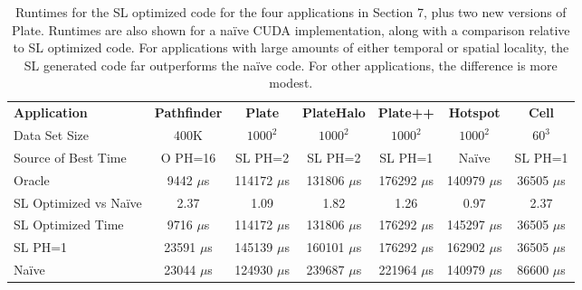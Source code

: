 \documentclass[preprint,nocopyrightspace]{styles/sigplanconf}
\begin{document}
\begin{table}
\centering
\begin{tabular}{|l|c|c|c|c|c|c|}
\hline
{\bf Application} & {\bf Pathfinder} & {\bf Plate} & {\bf PlateHalo} & {\bf Plate++} & {\bf Hotspot} & {\bf Cell} \\
Data Set Size	& 400K	& $1000^2$	& $1000^2$	& $1000^2$	& $1000^2$	& $60^3$	\\
\hline
Source of Best Time & O PH=16 	& SL PH=2	& SL PH=2	& SL PH=1	& Na\"{i}ve	& SL PH=1	\\
Oracle		& 9442 $\mu$s	& 114172 $\mu$s	& 131806 $\mu$s	& 176292 $\mu$s	& 140979 $\mu$s	& 36505 $\mu$s	\\
SL Optimized vs Na\"{i}ve & 2.37 & 1.09		& 1.82		& 1.26		& 0.97		& 2.37		\\
SL Optimized Time & 9716 $\mu$s	& 114172 $\mu$s	& 131806 $\mu$s	& 176292 $\mu$s	& 145297 $\mu$s	& 36505	$\mu$s	\\
SL PH=1		& 23591	$\mu$s	& 145139 $\mu$s	& 160101 $\mu$s	& 176292 $\mu$s	& 162902 $\mu$s	& 36505	$\mu$s	\\
Na\"{i}ve	& 23044	$\mu$s	& 124930 $\mu$s	& 239687 $\mu$s	& 221964 $\mu$s	& 140979 $\mu$s	& 86600	$\mu$s	\\
\hline
\end{tabular}
\caption{
Runtimes for the SL optimized code for the four applications in Section 7, plus
two new versions of Plate.  Runtimes are also shown for a na\"{i}ve CUDA
implementation, along with a comparison relative to SL optimized code.  For
applications with large amounts of either temporal or spatial locality, the SL
generated code far outperforms the na\"{i}ve code.  For other applications, the
difference is more modest.
}
\label{fig:GT200Table}
\end{table}
\end{document}
